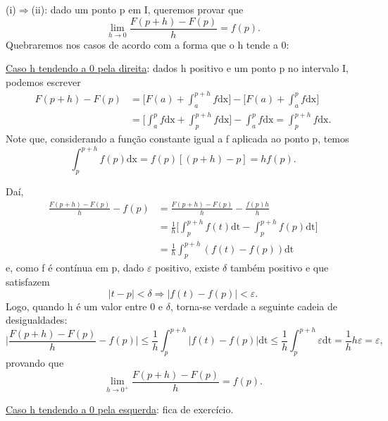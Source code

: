 \documentclass[../analysisII_notes.tex]{subfiles}
\begin{document}
\begin{proof*}
	(i)\(\Rightarrow \)(ii): dado um ponto p em I, queremos provar que
	\[
		\lim_{h\to 0}\frac{F(p+h)-F(p)}{h} = f(p).
	\]
	Quebraremos nos casos de acordo com a forma que o h tende a 0:

	\underline{Caso h tendendo a 0 pela direita}: dados h positivo e um ponto p no intervalo I, podemos escrever
	\begin{align*}
		F(p+h) - F(p) & = \biggl[F(a) + \int_{a}^{p+h}f \mathrm{dx}\biggr] - \biggl[F(a) + \int_{a}^{p}f \mathrm{dx}\biggr]                              \\
		              & =\biggl[\int_{a}^{p}f\mathrm{dx} + \int_{p}^{p+h}f \mathrm{dx}\biggr] - \int_{a}^{p}f \mathrm{dx} = \int_{p}^{p+h}f \mathrm{dx}.
	\end{align*}
	Note que, considerando a função constante igual a f aplicada ao ponto p, temos
	\[
		\int_{p}^{p+h}f(p) \mathrm{dx} = f(p)[(p+h) - p] = hf(p).
	\]

	Daí,
	\begin{align*}
		\frac{F(p+h)-F(p)}{h} - f(p) & = \frac{F(p+h)-F(p)}{h} - \frac{f(p)h}{h}                                                  \\
		                             & = \frac{1}{h}\biggl[\int_{p}^{p+h}f(t) \mathrm{dt} - \int_{p}^{p+h}f(p) \mathrm{dt}\biggr] \\
		                             & = \frac{1}{h}\int_{p}^{p+h}(f(t)-f(p)) \mathrm{dt}
	\end{align*}
	e, como f é contínua em p, dado \(\varepsilon \) positivo, existe \(\delta \) também positivo e que satisfazem
	\[
		|t-p|<\delta \Rightarrow |f(t)-f(p)|<\varepsilon .
	\]
	Logo, quando h é um valor entre 0 e \(\delta \), torna-se verdade a seguinte cadeia de desigualdades:
	\[
		\biggl\vert \frac{F(p+h)-F(p)}{h} - f(p) \biggr\vert \leq \frac{1}{h}\int_{p}^{p+h}|f(t)-f(p)| \mathrm{dt}\leq \frac{1}{h}\int_{p}^{p+h}\varepsilon  \mathrm{dt} = \frac{1}{h}h\varepsilon =\varepsilon,
	\]
	provando que
	\[
		\lim_{h\to 0^{+}}\frac{F(p+h)-F(p)}{h} = f(p).
	\]

	\underline{Caso h tendendo a 0 pela esquerda}: fica de exercício.


\end{proof*}
\end{document}

